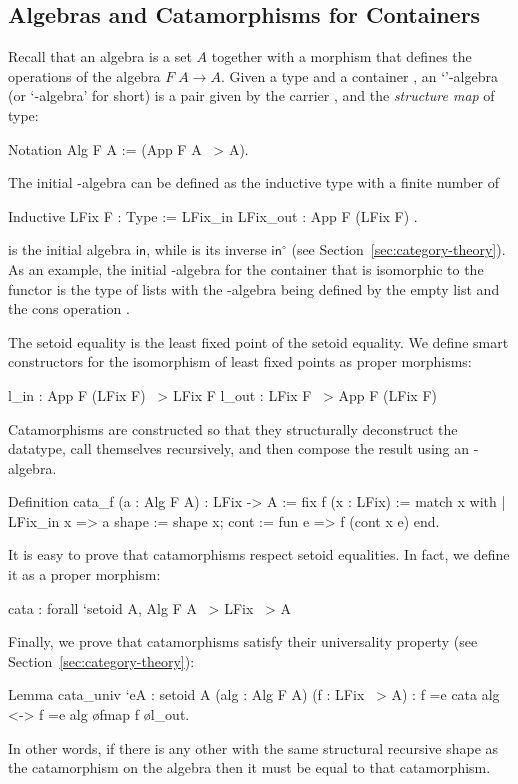 \documentclass[a4paper,anonymous, UKenglish,cleveref, autoref, thm-restate]{lipics-v2021}
\newcommand{\operator}[1]{\textsf{#1}}
\newcommand{\InOp}{\operator{in}^{\circ}}
\newcommand{\InIso}{\operator{in}}
\begin{document}
\subsection{Algebras and Catamorphisms for Containers}
\label{sec:coq-algebras}

Recall that an algebra is a set $A$ together with a morphism that defines the
operations of the algebra $F\;A \to A$.  Given a type  and a container
, an `'-algebra (or `-algebra' for short) is a pair
given by the carrier , and the \emph{structure map} of type:
\begin{coqcode}
Notation Alg F A := (App F A ~> A).
\end{coqcode}
The initial -algebra can be defined as the inductive type with a finite
number of 
\begin{coqcode}
Inductive LFix F : Type := LFix_in { LFix_out : App F (LFix F) }.
\end{coqcode}
 is the initial algebra $\InIso$, while  is its
inverse $\InOp$ (see Section~\ref{sec:category-theory}).  As an example, the
initial -algebra for the container that is isomorphic to the functor
 is the type of lists with the -algebra being
defined by the empty list  and the cons operation
.

The  setoid equality is the least fixed point of the 
setoid equality. We define smart constructors for the isomorphism of least fixed
points as proper morphisms:
\begin{coqcode}
l_in : App F (LFix F) ~> LFix F         l_out : LFix F ~> App F (LFix F)
\end{coqcode}

Catamorphisms are constructed so that they structurally deconstruct the
datatype, call themselves recursively, and then compose the result using an
-algebra.
\begin{coqcode}
Definition cata_f (a : Alg F A) : LFix -> A
  := fix f (x : LFix) := match x with
        | LFix_in x => a {shape := shape x; cont := fun e => f (cont x e)}
        end.
\end{coqcode}
It is easy to prove that catamorphisms respect setoid equalities.  In fact, we
define it as a proper morphism:
\begin{coqcode}
cata : forall `{setoid A}, Alg F A ~> LFix ~> A
\end{coqcode}
Finally, we prove that catamorphisms satisfy their universality property (see
Section~\ref{sec:category-theory}):
\begin{coqcode}
Lemma cata_univ `{eA : setoid A} (alg : Alg F A) (f : LFix ~> A)
    : f =e cata alg <-> f =e alg \o fmap f \o l_out.
\end{coqcode}
In other words, if there is any other  with the same structural recursive
shape as the catamorphism on the algebra  then it must be equal to that
catamorphism.
\end{document}
